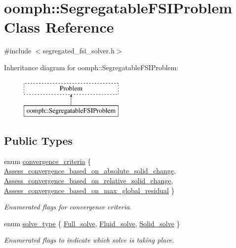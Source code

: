 \hypertarget{classoomph_1_1SegregatableFSIProblem}{}\section{oomph\+:\+:Segregatable\+F\+S\+I\+Problem Class Reference}
\label{classoomph_1_1SegregatableFSIProblem}


{\ttfamily \#include $<$segregated\+\_\+fsi\+\_\+solver.\+h$>$}

Inheritance diagram for oomph\+:\+:Segregatable\+F\+S\+I\+Problem\+:\begin{figure}[H]
\begin{center}
\leavevmode
\includegraphics[height=2.000000cm]{classoomph_1_1SegregatableFSIProblem}
\end{center}
\end{figure}
\subsection*{Public Types}
\begin{DoxyCompactItemize}
\item 
enum \hyperlink{classoomph_1_1SegregatableFSIProblem_a06634a6823bb5062d11e97f0be78f373}{convergence\+\_\+criteria} \{ \hyperlink{classoomph_1_1SegregatableFSIProblem_a06634a6823bb5062d11e97f0be78f373a96434fdb328f1440d763eb901f0e1dcc}{Assess\+\_\+convergence\+\_\+based\+\_\+on\+\_\+absolute\+\_\+solid\+\_\+change}, 
\hyperlink{classoomph_1_1SegregatableFSIProblem_a06634a6823bb5062d11e97f0be78f373a735439a264d7a63a310e12f384d5a081}{Assess\+\_\+convergence\+\_\+based\+\_\+on\+\_\+relative\+\_\+solid\+\_\+change}, 
\hyperlink{classoomph_1_1SegregatableFSIProblem_a06634a6823bb5062d11e97f0be78f373aaf32b15e9b1cc097ef3acff8a196bbbd}{Assess\+\_\+convergence\+\_\+based\+\_\+on\+\_\+max\+\_\+global\+\_\+residual}
 \}\begin{DoxyCompactList}\small\item\em Enumerated flags for convergence criteria. \end{DoxyCompactList}
\item 
enum \hyperlink{classoomph_1_1SegregatableFSIProblem_a263f8553427533dc831bd420b8fbf418}{solve\+\_\+type} \{ \hyperlink{classoomph_1_1SegregatableFSIProblem_a263f8553427533dc831bd420b8fbf418a0a2ec06d36907f018f82176e8256e76d}{Full\+\_\+solve}, 
\hyperlink{classoomph_1_1SegregatableFSIProblem_a263f8553427533dc831bd420b8fbf418ab5a200f3f251db5b62d69b7d80b98dae}{Fluid\+\_\+solve}, 
\hyperlink{classoomph_1_1SegregatableFSIProblem_a263f8553427533dc831bd420b8fbf418adb1f2e7a1cc45691468c5a5663ada4ca}{Solid\+\_\+solve}
 \}\begin{DoxyCompactList}\small\item\em Enumerated flags to indicate which solve is taking place. \end{DoxyCompactList}
\end{DoxyCompactItemize}
